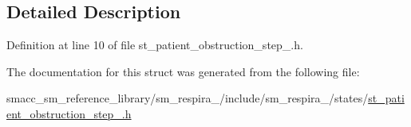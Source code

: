 \subsection{Detailed Description}


Definition at line 10 of file st\+\_\+patient\+\_\+obstruction\+\_\+step\+\_.\+h.



The documentation for this struct was generated from the following file\+:\begin{DoxyCompactItemize}
\item 
smacc\+\_\+sm\+\_\+reference\+\_\+library/sm\+\_\+respira\+\_/include/sm\+\_\+respira\+\_/states/\hyperlink{st__patient__obstruction__step__1_8h}{st\+\_\+patient\+\_\+obstruction\+\_\+step\+\_.\+h}\end{DoxyCompactItemize}
